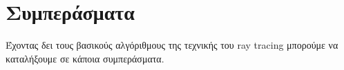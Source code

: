 
\def\baselinestretch{1}

\chapter{Συμπεράσματα}

\ifpdf
    \graphicspath{{Conclusions/ConclusionsFigs/PNG/}{Conclusions/ConclusionsFigs/PDF/}{Conclusions/ConclusionsFigs/}}
\else
    \graphicspath{{Conclusions/ConclusionsFigs/EPS/}{Conclusions/ConclusionsFigs/}}
\fi

\def\baselinestretch{1.66}

Έχοντας δει τους βασικούς αλγόριθμους της τεχνικής του ray tracing μπορούμε να καταλήξουμε σε
κάποια συμπεράσματα.

